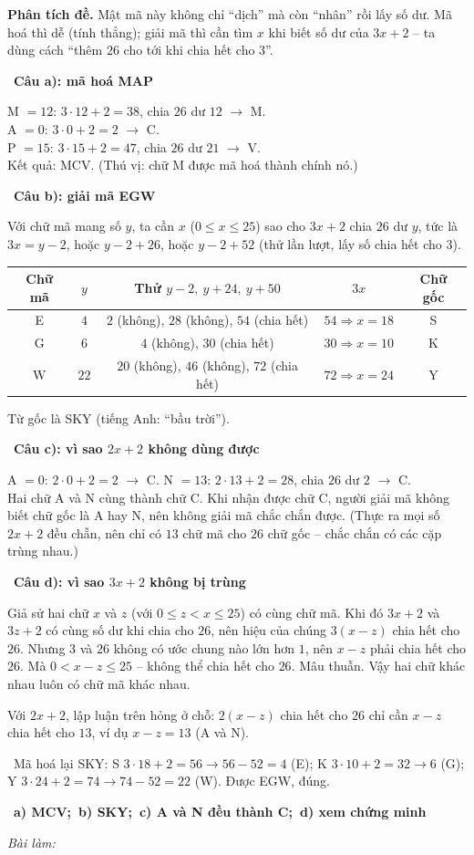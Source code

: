 \documentclass[11pt]{article}
\newif\ifsol \solfalse
\providecommand{\AnsWord}{Đáp số}
\newcommand{\StuProb}[2]{\begin{probboxS}{#1}{#2}\StuProbBody\end{probboxS}}
\newcommand{\ans}[1]{\par\smallskip{\bfseries\color{tmGreen!88!black}\AnsWord:}\ {\bfseries\color{AnsRed}#1}\par}
\newcommand{\probsol}[1]{%
  \begin{lrbox}{\solmeasure}\begin{minipage}{\dimexpr\linewidth-24pt\relax}#1\end{minipage}\end{lrbox}%
  \ifsol
    \begin{solbox}#1\end{solbox}%
  \else
    \setlength{\solht}{\dimexpr\ht\solmeasure+\dp\solmeasure+0.85cm\relax}%
    \ifdim\solht<1.35cm\setlength{\solht}{1.35cm}\fi
    \ifdim\solht>\StudentMaxWork\setlength{\solht}{\StudentMaxWork}\fi
    \par\noindent\begin{minipage}{\linewidth}%
    \expandafter\StuProb\StuProbArgs
    \begin{tcolorbox}[colback=white,colframe=Line,boxrule=0.8pt,arc=5pt,
      left=8pt,right=8pt,top=4pt,bottom=4pt,height=\solht]{\footnotesize\color{Slate}\itshape\WorkWord}\end{tcolorbox}%
    \end{minipage}\par\medskip
  \fi}
\newlength{\StudentMaxWork}\setlength{\StudentMaxWork}{4.5cm}
\newcommand{\step}[2]{\par\smallskip\noindent{\bfseries\color{tmBlue!85!black}\StepWord~#1.}\ {\bfseries #2}\par\nopagebreak}
\newcommand{\verify}[1]{\par\smallskip\noindent{\bfseries\color{tmGreen!80!black}\faCheckCircle\ \CheckWord}\ #1\par}
\def\WorkWord{Bài làm:}
\def\AnsWord{Đáp số}
\def\StepWord{Bước}
\def\CheckWord{Thử lại:}
\begin{document}
\probsol{
\textbf{Phân tích đề.} Mật mã này không chỉ ``dịch'' mà còn ``nhân'' rồi lấy số dư. Mã hoá thì dễ (tính thẳng); giải mã thì cần
tìm $x$ khi biết số dư của $3x + 2$ -- ta dùng cách ``thêm $26$ cho tới khi chia hết cho $3$''.
\step{1}{Câu a): mã hoá \textsf{MAP}}
M $= 12$: $3\cdot 12 + 2 = 38$, chia $26$ dư $12$ $\to$ M.\\
A $= 0$: $3\cdot 0 + 2 = 2$ $\to$ C.\\
P $= 15$: $3\cdot 15 + 2 = 47$, chia $26$ dư $21$ $\to$ V.\\
Kết quả: \textsf{MCV}. (Thú vị: chữ M được mã hoá thành chính nó.)
\step{2}{Câu b): giải mã \textsf{EGW}}
Với chữ mã mang số $y$, ta cần $x$ ($0 \le x \le 25$) sao cho $3x + 2$ chia $26$ dư $y$, tức là $3x = y - 2$, hoặc
$y - 2 + 26$, hoặc $y - 2 + 52$ (thử lần lượt, lấy số chia hết cho $3$).
\begin{center}\small
\begin{tabular}{|c|c|c|c|c|}
\hline
\rowcolor{tmBlue!10} Chữ mã & $y$ & Thử $y - 2,\ y + 24,\ y + 50$ & $3x$ & Chữ gốc\\ \hline
E & $4$ & $2$ (không), $28$ (không), $54$ (chia hết) & $54 \Rightarrow x = 18$ & S\\ \hline
G & $6$ & $4$ (không), $30$ (chia hết) & $30 \Rightarrow x = 10$ & K\\ \hline
W & $22$ & $20$ (không), $46$ (không), $72$ (chia hết) & $72 \Rightarrow x = 24$ & Y\\ \hline
\end{tabular}
\end{center}
Từ gốc là \textsf{SKY} (tiếng Anh: ``bầu trời'').
\step{3}{Câu c): vì sao $2x + 2$ không dùng được}
A $= 0$: $2\cdot 0 + 2 = 2$ $\to$ C. \quad N $= 13$: $2\cdot 13 + 2 = 28$, chia $26$ dư $2$ $\to$ C.\\
Hai chữ A và N cùng thành chữ C. Khi nhận được chữ C, người giải mã không biết chữ gốc là A hay N, nên không giải mã chắc chắn
được. (Thực ra mọi số $2x + 2$ đều chẵn, nên chỉ có $13$ chữ mã cho $26$ chữ gốc -- chắc chắn có các cặp trùng nhau.)
\step{4}{Câu d): vì sao $3x + 2$ không bị trùng}
\begin{proofbox}Giả sử hai chữ $x$ và $z$ (với $0 \le z < x \le 25$) có cùng chữ mã. Khi đó $3x + 2$ và $3z + 2$ có cùng số dư khi
chia cho $26$, nên hiệu của chúng $3(x - z)$ chia hết cho $26$. Nhưng $3$ và $26$ không có ước chung nào lớn hơn $1$, nên
$x - z$ phải chia hết cho $26$. Mà $0 < x - z \le 25$ -- không thể chia hết cho $26$. Mâu thuẫn. Vậy hai chữ khác nhau luôn có chữ
mã khác nhau.\end{proofbox}
\begin{warnbox}Với $2x + 2$, lập luận trên hỏng ở chỗ: $2(x - z)$ chia hết cho $26$ chỉ cần $x - z$ chia hết cho $13$, ví dụ
$x - z = 13$ (A và N).\end{warnbox}
\verify{Mã hoá lại \textsf{SKY}: S $3\cdot 18 + 2 = 56 \to 56 - 52 = 4$ (E); K $3\cdot 10 + 2 = 32 \to 6$ (G); Y $3\cdot 24 + 2 = 74 \to 74 - 52 = 22$ (W). Được
\textsf{EGW}, đúng.}
\ans{a) \textsf{MCV};\ b) \textsf{SKY};\ c) A và N đều thành C;\ d) xem chứng minh}
}
\end{document}
